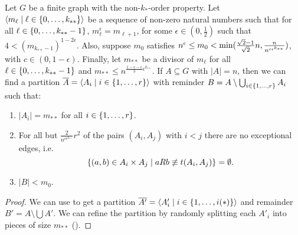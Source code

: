         \begin{lemma} \label{lem:existance_of_equitative_partition_with_bound_exceptional_pairs}
            Let $G$ be a finite graph with the non-$k_{*}$-order property.
            \sloppy Let $\left< m_\ell \mid \ell \in \{ 0, \dots, k_{**} \} \right>$ be a sequence of non-zero natural numbers such that
            for all $\ell \in \{ 0, \dots, k_{**}-1 \}$, $m_\ell^\epsilon = m_{\ell+1}$,
            for some $\epsilon \in (0, \frac{1}{2})$ such that $4 < (m_{k_{**}-1})^{1-2\epsilon}$.
            Also, suppose $m_0$ satisfies $n^\epsilon \leq m_0 < \min ( \frac{\sqrt{2}-1}{\sqrt{2}} n, \frac{n}{n^{c \epsilon^{k_{**}}}} )$,
            with $c \in (0, 1-\epsilon)$.
            Finally, let $m_{**}$ be a divisor of $m_\ell$ for all $\ell \in \{ 0, \dots, k_{**}-1 \}$ and
            $m_{**} \leq n^{\frac{1 - \epsilon - c}{3}\epsilon^{k_{**}}}$.
            If $A \subseteq G$ with $|A| = n$, then we can find a partition $\overline{A} = \left< A_i \mid i \in \{ 1, \dots, r \} \right>$
            with reminder $B = A \setminus \bigcup_{i \in \{ 1, \dots, r \}} A_i$ such that:
            \begin{enumerate}
                \item \label{itm:existance_of_equitative_partition_with_bound_exceptional_pairs.1} $|A_i| = m_{**}$ for all $i \in \{ 1, \dots, r \}$.
                \item \label{itm:existance_of_equitative_partition_with_bound_exceptional_pairs.2} For all but $\frac{2}{n^{c\epsilon^{k_{**}}}}r^2$ of the pairs
                    $(A_i, A_j)$ with $i<j$ there are no exceptional edges, i.e.
                    \[
                        \{ (a,b) \in A_i \times A_j \mid a R b \not\equiv t(A_i, A_j) \} = \emptyset.
                    \]
                \item \label{itm:existance_of_equitative_partition_with_bound_exceptional_pairs.3} $|B| < m_0$.
            \end{enumerate}
            \begin{proof}
                We can use  to get a partition
                $\overline{A'} = \left< A'_i \mid i \in \{ 1, \dots, i(*) \} \right>$ and remainder $B' = A \setminus \bigcup A'$.
                We can refine the partition by randomly splitting each $A'_i$ into pieces of size $m_{**}$ ().

\end{proof}
\end{lemma}
